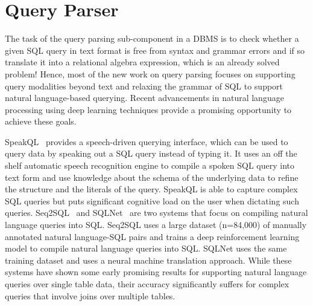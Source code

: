 \section{Query Parser}
The task of the query parsing sub-component in a DBMS is to check whether a given SQL query in text format is free from syntax and grammar errors and if so translate it into a relational algebra expression, which is an already solved problem!
Hence, most of the new work on query parsing focuses on supporting query modalities beyond text and relaxing the grammar of SQL to support natural language-based querying.
Recent advancements in natural language processing using deep learning techniques provide a promising opportunity to achieve these goals.

SpeakQL~\cite{speakql} provides a speech-driven querying interface, which can be used to query data by speaking out a SQL query instead of typing it.
It uses an off the shelf automatic speech recognition engine to compile a spoken SQL query into text form and use knowledge about the schema of the underlying data to refine the structure and the literals of the query.
SpeakQL is able to capture complex SQL queries but puts significant cognitive load on the user when dictating such queries.
Seq2SQL~\cite{seq2sql} and SQLNet~\cite{sqlnet} are two systems that focus on compiling natural language queries into SQL.
Seq2SQL uses a large dataset (n=84,000) of manually annotated natural language-SQL pairs and trains a deep reinforcement learning model to compile natural language queries into SQL.
SQLNet uses the same training dataset and uses a neural machine translation approach.
While these systems have shown some early promising results for supporting natural language queries over single table data, their accuracy significantly suffers for complex queries that involve joins over multiple tables.
